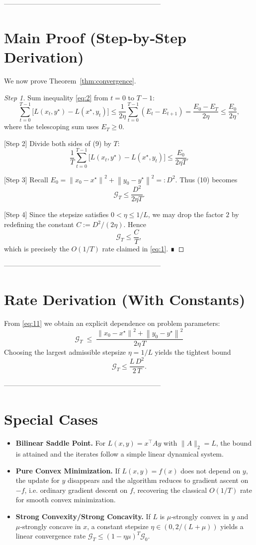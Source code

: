 \documentclass{article}
\newcommand{\norm}[1]{\left\lVert#1\right\rVert}
\begin{document}
--------------------------------------------------------------------
\section*{Main Proof (Step‑by‑Step Derivation)}
We now prove Theorem~\ref{thm:convergence}.

\begin{proof}
[Step 1] Sum inequality \eqref{eq:2} from $t=0$ to $T-1$:
\[
\sum_{t=0}^{T-1} \bigl[ L(x_t,y^\star)-L(x^\star,y_t) \bigr]
\le \frac{1}{2\eta}\sum_{t=0}^{T-1} (E_t-E_{t+1})
= \frac{E_0-E_T}{2\eta}
\le \frac{E_0}{2\eta},
\tag{9}
\]
where the telescoping sum uses $E_T\ge0$.

[Step 2] Divide both sides of (9) by $T$:
\[
\frac{1}{T}\sum_{t=0}^{T-1}
\bigl[ L(x_t,y^\star)-L(x^\star,y_t) \bigr]
\le \frac{E_0}{2\eta T}.
\tag{10}
\]

[Step 3] Recall $E_0=\norm{x_0-x^\star}^2+\norm{y_0-y^\star}^2=:D^2$.
Thus (10) becomes
\[
\mathcal{G}_T \le \frac{D^2}{2\eta T}.
\tag{11}
\]

[Step 4] Since the stepsize satisfies $0<\eta\le1/L$, we may drop the factor $2$ by redefining the constant $C:=D^2/(2\eta)$. Hence
\[
\mathcal{G}_T \le \frac{C}{T},
\]
which is precisely the $O(1/T)$ rate claimed in \eqref{eq:1}. ∎
\end{proof}

--------------------------------------------------------------------
\section*{Rate Derivation (With Constants)}
From \eqref{eq:11} we obtain an explicit dependence on problem parameters:
\[
\boxed{\;
\mathcal{G}_T \;\le\; \frac{\norm{x_0-x^\star}^2+\norm{y_0-y^\star}^2}{2\eta\,T}
\;}
\]
Choosing the largest admissible stepsize $\eta=1/L$ yields the tightest bound
\[
\mathcal{G}_T \le \frac{L\,D^2}{2\,T}.
\]

--------------------------------------------------------------------
\section*{Special Cases}
\begin{itemize}
\item \textbf{Bilinear Saddle Point.} For $L(x,y)=x^\top A y$ with $\|A\|_2=L$, the
  bound is attained and the iterates follow a simple linear dynamical system.
\item \textbf{Pure Convex Minimization.} If $L(x,y)=f(x)$ does not depend on $y$,
  the update for $y$ disappears and the algorithm reduces to gradient ascent on
  $-f$, i.e. ordinary gradient descent on $f$, recovering the classical
  $O(1/T)$ rate for smooth convex minimization.
\item \textbf{Strong Convexity/Strong Concavity.} If $L$ is $\mu$‑strongly
  convex in $y$ and $\mu$‑strongly concave in $x$, a constant stepsize
  $\eta\in(0,2/(L+\mu))$ yields a linear convergence rate
  $ \mathcal{G}_T\le (1-\eta\mu)^T\mathcal{G}_0$.
\end{itemize}
\end{document}
